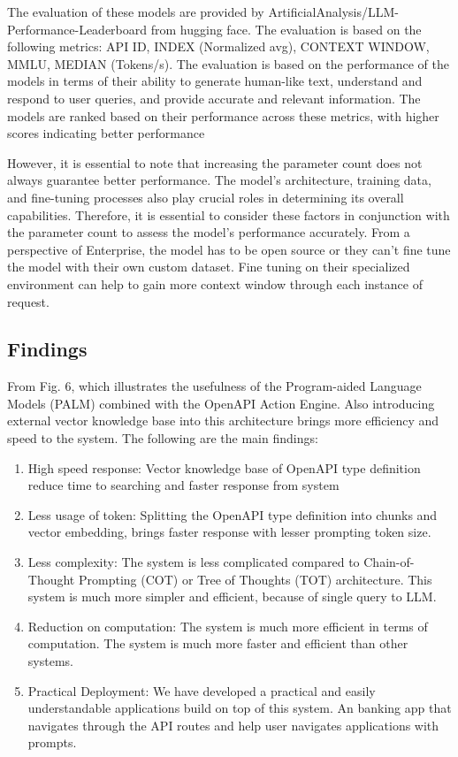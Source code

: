 \documentclass[conference]{IEEEtran}
\begin{document}
The evaluation of these models are provided by ArtificialAnalysis/LLM-Performance-Leaderboard from hugging face. The evaluation is based on the following metrics: API ID, INDEX (Normalized avg), CONTEXT WINDOW, MMLU, MEDIAN (Tokens/s). The evaluation is based on the performance of the models in terms of their ability to generate human-like text, understand and respond to user queries, and provide accurate and relevant information. The models are ranked based on their performance across these metrics, with higher scores indicating better performance

However, it is essential to note that increasing the parameter count does not always guarantee better performance. The model's architecture, training data, and fine-tuning processes also play crucial roles in determining its overall capabilities. Therefore, it is essential to consider these factors in conjunction with the parameter count to assess the model's performance accurately. From a perspective of Enterprise, the model has to be open source or they can't fine tune the model with their own custom dataset. Fine tuning on their specialized environment can help to gain more context window through each instance of request.

\subsection{Findings}
From Fig. 6, which illustrates the usefulness of the Program-aided Language Models (PALM) combined with the OpenAPI Action Engine. Also introducing external vector knowledge base into this architecture brings more efficiency and speed to the system.
The following are the main findings:
\begin{enumerate}
    \item  High speed response: Vector knowledge base of OpenAPI type definition reduce time to searching and faster response from system
    \item Less usage of token: Splitting the OpenAPI type definition into chunks and vector embedding, brings faster response with lesser prompting token size.
     \item Less complexity: The system is less complicated compared to Chain-of-Thought Prompting (COT) or Tree of Thoughts (TOT) architecture. This system is much more simpler and efficient, because of single query to LLM.
     \item Reduction on computation: The system is much more efficient in terms of computation. The system is much more faster and efficient than other systems.
    \item Practical Deployment: We have developed a practical and
    easily understandable applications build on top of this system. An banking app that navigates through the API routes and help user navigates applications with prompts.
\end{enumerate}
\end{document}
